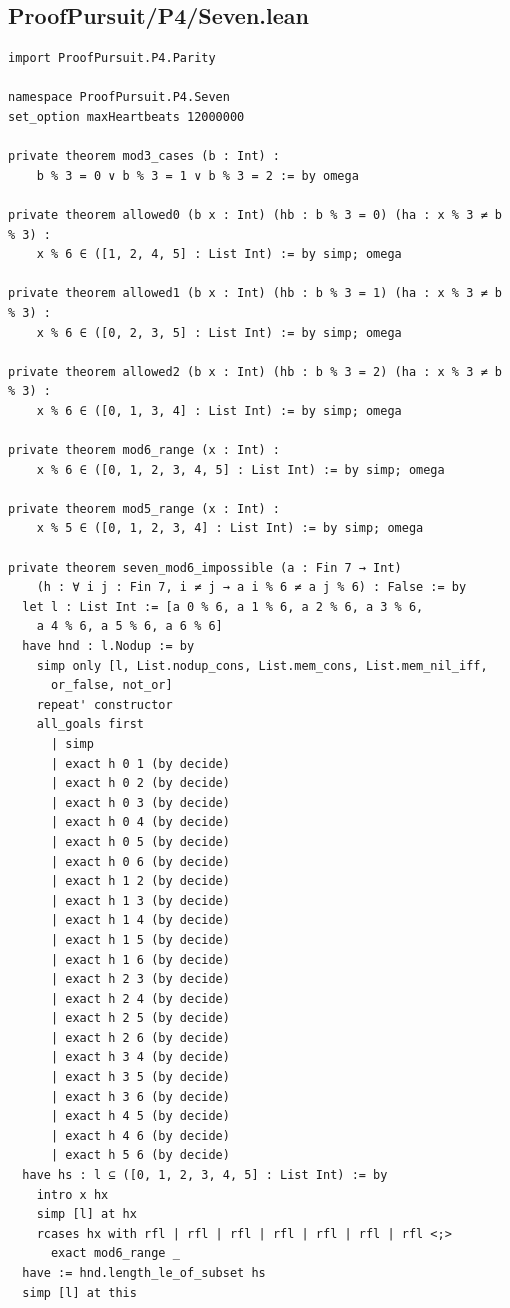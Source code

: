 \documentclass[11pt,a4paper]{article}
\begin{document}
\subsection{ProofPursuit/P4/Seven.lean}\label{proofpursuitp4seven.lean}

\begin{Verbatim}[breaklines,breakanywhere,fontsize=\footnotesize]
import ProofPursuit.P4.Parity

namespace ProofPursuit.P4.Seven
set_option maxHeartbeats 12000000

private theorem mod3_cases (b : Int) :
    b % 3 = 0 ∨ b % 3 = 1 ∨ b % 3 = 2 := by omega

private theorem allowed0 (b x : Int) (hb : b % 3 = 0) (ha : x % 3 ≠ b % 3) :
    x % 6 ∈ ([1, 2, 4, 5] : List Int) := by simp; omega

private theorem allowed1 (b x : Int) (hb : b % 3 = 1) (ha : x % 3 ≠ b % 3) :
    x % 6 ∈ ([0, 2, 3, 5] : List Int) := by simp; omega

private theorem allowed2 (b x : Int) (hb : b % 3 = 2) (ha : x % 3 ≠ b % 3) :
    x % 6 ∈ ([0, 1, 3, 4] : List Int) := by simp; omega

private theorem mod6_range (x : Int) :
    x % 6 ∈ ([0, 1, 2, 3, 4, 5] : List Int) := by simp; omega

private theorem mod5_range (x : Int) :
    x % 5 ∈ ([0, 1, 2, 3, 4] : List Int) := by simp; omega

private theorem seven_mod6_impossible (a : Fin 7 → Int)
    (h : ∀ i j : Fin 7, i ≠ j → a i % 6 ≠ a j % 6) : False := by
  let l : List Int := [a 0 % 6, a 1 % 6, a 2 % 6, a 3 % 6,
    a 4 % 6, a 5 % 6, a 6 % 6]
  have hnd : l.Nodup := by
    simp only [l, List.nodup_cons, List.mem_cons, List.mem_nil_iff,
      or_false, not_or]
    repeat' constructor
    all_goals first
      | simp
      | exact h 0 1 (by decide)
      | exact h 0 2 (by decide)
      | exact h 0 3 (by decide)
      | exact h 0 4 (by decide)
      | exact h 0 5 (by decide)
      | exact h 0 6 (by decide)
      | exact h 1 2 (by decide)
      | exact h 1 3 (by decide)
      | exact h 1 4 (by decide)
      | exact h 1 5 (by decide)
      | exact h 1 6 (by decide)
      | exact h 2 3 (by decide)
      | exact h 2 4 (by decide)
      | exact h 2 5 (by decide)
      | exact h 2 6 (by decide)
      | exact h 3 4 (by decide)
      | exact h 3 5 (by decide)
      | exact h 3 6 (by decide)
      | exact h 4 5 (by decide)
      | exact h 4 6 (by decide)
      | exact h 5 6 (by decide)
  have hs : l ⊆ ([0, 1, 2, 3, 4, 5] : List Int) := by
    intro x hx
    simp [l] at hx
    rcases hx with rfl | rfl | rfl | rfl | rfl | rfl | rfl <;>
      exact mod6_range _
  have := hnd.length_le_of_subset hs
  simp [l] at this


\end{Verbatim}
\end{document}
